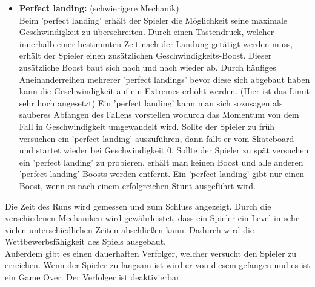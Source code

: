 \documentclass[paper=a4,fontsize=12pt,ngerman]{scrartcl}
\begin{document}
\begin{itemize}
	\item \textbf{Perfect landing:} (schwierigere Mechanik)\\ Beim 'perfect landing' erhält der Spieler die Möglichkeit seine maximale Geschwindigkeit zu
	überschreiten.
	Durch einen Tastendruck, welcher innerhalb einer bestimmten Zeit nach der Landung
	getätigt werden muss, erhält der Spieler einen zusätzlichen Geschwindigkeits-Boost.
	Dieser zusätzliche Boost baut sich nach und nach wieder ab. Durch häufiges Aneinanderreihen mehrerer 'perfect landings' bevor diese sich abgebaut haben kann die Geschwindigkeit
	auf ein Extremes erhöht werden. (Hier ist das Limit sehr hoch angesetzt)
	Ein 'perfect landing' kann man sich sozusagen als sauberes Abfangen des Fallens vorstellen
	wodurch das Momentum von dem Fall in Geschwindigkeit umgewandelt wird.
	Sollte der Spieler zu früh versuchen ein 'perfect landing' auszuführen, dann fällt er vom
	Skateboard und startet wieder bei Geschwindigkeit 0.
	Sollte der Spieler zu spät versuchen ein 'perfect landing' zu probieren, erhält man keinen Boost
	und alle anderen 'perfect landing'-Boosts werden entfernt.
	Ein 'perfect landing' gibt nur einen Boost, wenn es nach einem erfolgreichen Stunt ausgeführt wird.
\end{itemize}
	
	Die Zeit des Runs wird gemessen und zum Schluss angezeigt. Durch die verschiedenen
	Mechaniken wird gewährleistet, dass ein Spieler ein Level in sehr vielen
	unterschiedlichen Zeiten abschließen kann. Dadurch wird die Wettbewerbsfähigkeit des
	Spiels ausgebaut.\\
	
	Außerdem gibt es einen dauerhaften Verfolger, welcher versucht den Spieler zu erreichen.
	Wenn der Spieler zu langsam ist wird er von diesem gefangen und es ist ein Game Over.
	Der Verfolger ist deaktivierbar.
\clearpage
\end{document}
